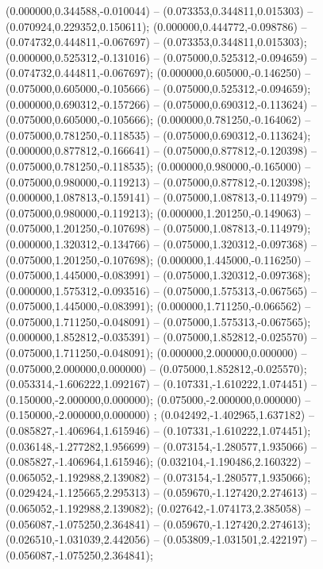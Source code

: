  (0.000000,0.344588,-0.010044) -- (0.073353,0.344811,0.015303) -- (0.070924,0.229352,0.150611);
 (0.000000,0.444772,-0.098786) -- (0.074732,0.444811,-0.067697) -- (0.073353,0.344811,0.015303);
 (0.000000,0.525312,-0.131016) -- (0.075000,0.525312,-0.094659) -- (0.074732,0.444811,-0.067697);
 (0.000000,0.605000,-0.146250) -- (0.075000,0.605000,-0.105666) -- (0.075000,0.525312,-0.094659);
 (0.000000,0.690312,-0.157266) -- (0.075000,0.690312,-0.113624) -- (0.075000,0.605000,-0.105666);
 (0.000000,0.781250,-0.164062) -- (0.075000,0.781250,-0.118535) -- (0.075000,0.690312,-0.113624);
 (0.000000,0.877812,-0.166641) -- (0.075000,0.877812,-0.120398) -- (0.075000,0.781250,-0.118535);
 (0.000000,0.980000,-0.165000) -- (0.075000,0.980000,-0.119213) -- (0.075000,0.877812,-0.120398);
 (0.000000,1.087813,-0.159141) -- (0.075000,1.087813,-0.114979) -- (0.075000,0.980000,-0.119213);
 (0.000000,1.201250,-0.149063) -- (0.075000,1.201250,-0.107698) -- (0.075000,1.087813,-0.114979);
 (0.000000,1.320312,-0.134766) -- (0.075000,1.320312,-0.097368) -- (0.075000,1.201250,-0.107698);
 (0.000000,1.445000,-0.116250) -- (0.075000,1.445000,-0.083991) -- (0.075000,1.320312,-0.097368);
 (0.000000,1.575312,-0.093516) -- (0.075000,1.575313,-0.067565) -- (0.075000,1.445000,-0.083991);
 (0.000000,1.711250,-0.066562) -- (0.075000,1.711250,-0.048091) -- (0.075000,1.575313,-0.067565);
 (0.000000,1.852812,-0.035391) -- (0.075000,1.852812,-0.025570) -- (0.075000,1.711250,-0.048091);
 (0.000000,2.000000,0.000000) -- (0.075000,2.000000,0.000000) -- (0.075000,1.852812,-0.025570);
 (0.053314,-1.606222,1.092167) -- (0.107331,-1.610222,1.074451) -- (0.150000,-2.000000,0.000000);
 (0.075000,-2.000000,0.000000) -- (0.150000,-2.000000,0.000000) ;
 (0.042492,-1.402965,1.637182) -- (0.085827,-1.406964,1.615946) -- (0.107331,-1.610222,1.074451);
 (0.036148,-1.277282,1.956699) -- (0.073154,-1.280577,1.935066) -- (0.085827,-1.406964,1.615946);
 (0.032104,-1.190486,2.160322) -- (0.065052,-1.192988,2.139082) -- (0.073154,-1.280577,1.935066);
 (0.029424,-1.125665,2.295313) -- (0.059670,-1.127420,2.274613) -- (0.065052,-1.192988,2.139082);
 (0.027642,-1.074173,2.385058) -- (0.056087,-1.075250,2.364841) -- (0.059670,-1.127420,2.274613);
 (0.026510,-1.031039,2.442056) -- (0.053809,-1.031501,2.422197) -- (0.056087,-1.075250,2.364841);
